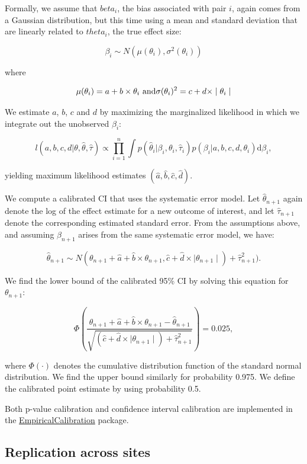 \documentclass[11pt]{book}
\theoremstyle{definition}
\theoremstyle{definition}
\theoremstyle{definition}
\theoremstyle{remark}
\begin{document}
Formally, we assume that \(beta_i\), the bias associated with pair \(i\), again comes from a Gaussian distribution, but this time using a mean and standard deviation that are linearly related to \(theta_i\), the true effect size:

\[\beta_i \sim N(\mu(\theta_i) , \sigma^2(\theta_i))\]

where

\[\mu(\theta_i) = a + b \times \theta_i \text{ and} \\
  \sigma(\theta_i) ^2= c + d \times \mid \theta_i \mid\]

We estimate \(a\), \(b\), \(c\) and \(d\) by maximizing the marginalized likelihood in which we integrate out the unobserved \(\beta_i\):

\[l(a,b,c,d | \theta, \hat{\theta}, \hat{\tau} ) \propto \prod_{i=1}^{n}\int p(\hat{\theta}_i|\beta_i, \theta_i, \hat{\tau}_i)p(\beta_i|a,b,c,d,\theta_i) \text{d}\beta_i ,\]

yielding maximum likelihood estimates \((\hat{a}, \hat{b}, \hat{c}, \hat{d})\).

We compute a calibrated CI that uses the systematic error model. Let \(\hat{\theta}_{n+1}\) again denote the log of the effect estimate for a new outcome of interest, and let \(\hat{\tau}_{n+1}\) denote the corresponding estimated standard error. From the assumptions above, and assuming \(\beta_{n+1}\) arises from the same systematic error model, we have:

\[\hat{\theta}_{n+1} \sim N(
\theta_{n+1} + \hat{a} + \hat{b} \times \theta_{n+1},
\hat{c} + \hat{d} \times \mid \theta_{n+1} \mid) + \hat{\tau}_{n+1}^2) .\]

We find the lower bound of the calibrated 95\% CI by solving this equation for \(\theta_{n+1}\):

\[\Phi\left(
\frac{\theta_{n+1} + \hat{a} + \hat{b} \times \theta_{n+1}-\hat{\theta}_{n+1}}
{\sqrt{(\hat{c} + \hat{d} \times \mid \theta_{n+1} \mid) + \hat{\tau}_{n+1}^2}}
\right) = 0.025 ,\]

where \(\Phi(\cdot)\) denotes the cumulative distribution function of the standard normal distribution. We find the upper bound similarly for probability 0.975. We define the calibrated point estimate by using probability 0.5.

Both p-value calibration and confidence interval calibration are implemented in the \href{https://ohdsi.github.io/EmpiricalCalibration/}{EmpiricalCalibration} package.

\hypertarget{replication-across-sites}{%
\subsection{Replication across sites}\label{replication-across-sites}}
\end{document}
